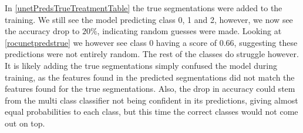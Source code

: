 In \autoref{unetPredsTrueTreatmentTable} the true segmentations were added to the training. We still see the model predicting class 0, 1 and 2, however, we now see the accuracy drop to $20\%$, indicating random guesses were made. Looking at \autoref{rocunetpredstrue} we however see class 0 having a score of $0.66$, suggesting these predictions were not entirely random. The rest of the classes do struggle however. It is likely adding the true segmentations simply confused the model during training, as the features found in the predicted segmentations did not match the features found for the true segmentations. Also, the drop in accuracy could stem from the multi class classifier not being confident in its predictions, giving almost equal probabilities to each class, but this time the correct classes would not come out on top.

















